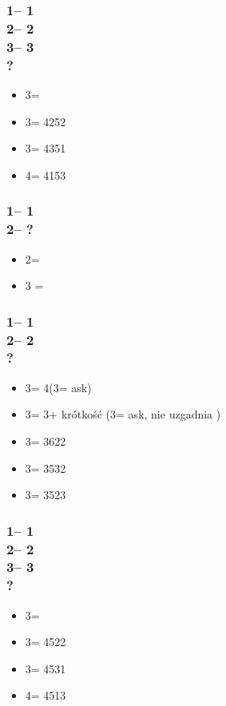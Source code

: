 \documentclass[12pt, a4paper]{report}
\begin{document}
{    \subsubsection*{1\diams -- 1\spades\\
                    2\spades -- 2\nt\\
                    3\clubs -- 3\diams\\
                    ?}
    \begin{itemize}
        \item 3\hearts = \bal
        \item 3\spades = 4252
        \item 3\nt = 4351
        \item 4\clubs = 4153
    \end{itemize}

    \subsubsection*{1\hearts -- 1\spades\\
                    2\spades -- ?}
    \begin{itemize}
        \item 2\nt = \gf
        \item 3 = \inv
    \end{itemize}

    \subsubsection*{1\hearts -- 1\spades\\
                    2\spades -- 2\nt\\
                    ?}
    \begin{itemize}
        \item 3\clubs = 4\spades (3\diams = ask)
        \item 3\diams = 3\spades + krótkość (3\hearts = ask, nie uzgadnia \spades)
        \item 3\hearts = 3622
        \item 3\spades = 3532
        \item 3\nt = 3523
    \end{itemize}

    \subsubsection*{1\hearts -- 1\spades\\
                    2\spades -- 2\nt\\
                    3\clubs -- 3\diams\\
                    ?}
    \begin{itemize}
        \item 3\hearts = \bal
        \item 3\spades = 4522
        \item 3\nt = 4531
        \item 4\clubs = 4513
    \end{itemize}

}
\end{document}
